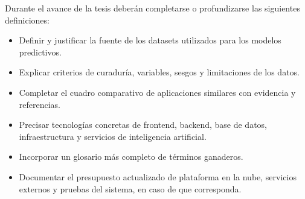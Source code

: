 
Durante el avance de la tesis deber\'an completarse o profundizarse las siguientes definiciones:

\begin{itemize}
    \item Definir y justificar la fuente de los datasets utilizados para los modelos predictivos.
    \item Explicar criterios de curadur\'ia, variables, sesgos y limitaciones de los datos.
    \item Completar el cuadro comparativo de aplicaciones similares con evidencia y referencias.
    \item Precisar tecnolog\'ias concretas de frontend, backend, base de datos, infraestructura y servicios de inteligencia artificial.
    \item Incorporar un glosario m\'as completo de t\'erminos ganaderos.
    \item Documentar el presupuesto actualizado de plataforma en la nube, servicios externos y pruebas del sistema, en caso de que corresponda.
\end{itemize}
